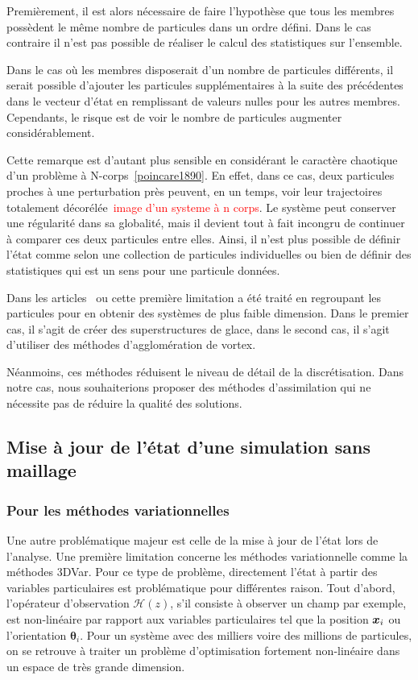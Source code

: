 Premièrement, il est alors nécessaire de faire l'hypothèse que tous les membres possèdent le même nombre de particules dans un ordre défini.
Dans le cas contraire il n'est pas possible de réaliser le calcul des statistiques sur l'ensemble.

Dans le cas où les membres disposerait d'un nombre de particules différents, il serait possible d'ajouter les particules supplémentaires à la suite des précédentes dans le vecteur d'état en remplissant de valeurs nulles pour les autres membres. Cependants, le risque est de voir le nombre de particules augmenter considérablement.

Cette remarque est d'autant plus sensible en considérant le caractère chaotique d'un problème à N-corps~\ref{poincare1890}. En effet, dans ce cas, deux particules proches à une perturbation près peuvent, en un temps, voir leur trajectoires totalement décorélée~\textcolor{red}{image d'un systeme à n corps}. Le système peut conserver une régularité dans sa globalité, mais il devient tout à fait incongru de continuer à comparer ces deux particules entre elles. Ainsi, il n'est plus possible de définir l'état comme selon une collection de particules individuelles ou bien de définir des statistiques qui est un sens pour une particule données.

Dans les articles~\cite{chen_superfloe_2022} ou \cite{darakananda_data-assimilated_2018} cette première limitation a été traité en regroupant les particules pour en obtenir des systèmes de plus faible dimension. Dans le premier cas, il s'agit de créer des superstructures de glace, dans le second cas, il s'agit d'utiliser des méthodes d'agglomération de vortex.

Néanmoins, ces méthodes réduisent le niveau de détail de la discrétisation. Dans notre cas, nous souhaiterions proposer des méthodes d'assimilation qui ne nécessite pas de réduire la qualité des solutions.

\subsection{Mise à jour de l'état d'une simulation sans maillage}

\subsubsection{Pour les méthodes variationnelles}

Une autre problématique majeur est celle de la mise à jour de l'état lors de l'analyse.
Une première limitation concerne les méthodes variationnelle comme la méthodes 3DVar. Pour ce type de problème, directement l'état à partir des variables particulaires est problématique pour différentes raison. Tout d'abord, l'opérateur d'observation $\mathcal H(z)$, s'il consiste à observer un champ par exemple, est non-linéaire par rapport aux variables particulaires tel que la position $\bm{x}_i$ ou l'orientation $\bm \theta_i$. Pour un système avec des milliers voire des millions de particules, on se retrouve à traiter un problème d'optimisation fortement non-linéaire dans un espace de très grande dimension.

